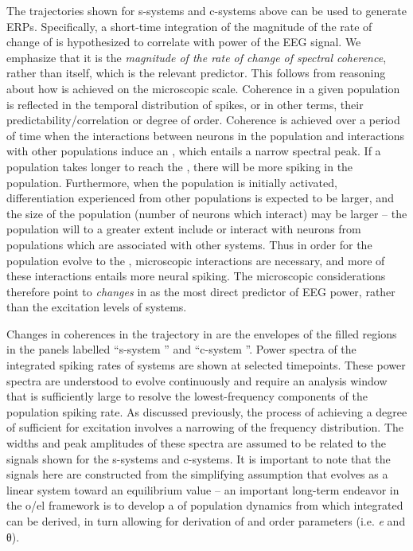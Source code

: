  The  trajectories shown for s-systems and c-systems above can be used to generate ERPs. Specifically, a short-time integration of the magnitude of the rate of change of  is hypothesized to correlate with power of the EEG signal. We emphasize that it is the \textit{magnitude of the rate of change of spectral coherence}, rather than  itself, which is the relevant predictor. This follows from reasoning about how  is achieved on the microscopic scale. Coherence in a given population is reflected in the temporal distribution of spikes, or in other terms, their predictability/correlation or degree of order. Coherence is achieved over a period of time when the interactions between neurons in the population and interactions with other populations induce an , which entails a narrow spectral peak. If a population takes longer to reach the , there will be more spiking in the population. Furthermore, when the population is initially activated, differentiation  experienced from other populations is expected to be larger, and the size of the population (number of neurons which interact) may be larger -- the population will to a greater extent include or interact with neurons from populations which are associated with other systems. Thus in order for the population evolve to the , microscopic interactions are necessary, and more of these interactions entails more neural spiking. The microscopic considerations therefore point to \textit{changes} in  as the most direct predictor of EEG power, rather than the excitation levels of systems. 

Changes in coherences in the trajectory in {} are the envelopes of the filled regions in the panels labelled “s-system ” and “c-system ”. Power spectra of the integrated spiking rates of systems are shown at selected timepoints. These power spectra are understood to evolve continuously and require an analysis window that is sufficiently large to resolve the lowest-frequency components of the population spiking rate. As discussed previously, the process of achieving a degree of  sufficient for excitation involves a narrowing of the frequency distribution. The widths and peak amplitudes of these spectra are assumed to be related to the  signals shown for the s-systems and c-systems. It is important to note that the  signals here are constructed from the simplifying assumption that  evolves as a linear system toward an equilibrium value -- an important long-term endeavor in the o/el framework is to develop a  of population dynamics from which integrated  can be derived, in turn allowing for derivation of  and order parameters (i.e. \textit{e} and θ). 

